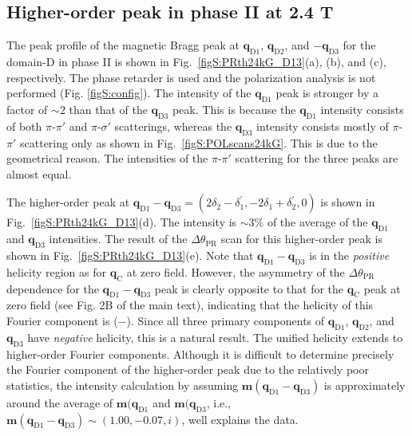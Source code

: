 \documentclass[aps,prb,reprint,superscriptaddress,amsmath,amssymb]{revtex4-2}
\begin{document}
\newpage
\subsection{Higher-order peak in phase II at 2.4 T}
The peak profile of the magnetic Bragg peak at $\bm{q}_{\text{D1}}$, $\bm{q}_{\text{D2}}$, and $-\bm{q}_{\text{D3}}$ for the domain-D in phase II is shown in Fig.~\ref{figS:PRth24kG_D13}(a), (b), and (c), respectively. The phase retarder is used and the polarization analysis is not performed (Fig. \ref{figS:config}). 
The intensity of the $\bm{q}_{\text{D1}}$ peak is stronger by a factor of $\sim 2$ than that of the $\bm{q}_{\text{D3}}$ peak. 
This is because the $\bm{q}_{\text{D1}}$ intensity consists of both $\pi$-$\pi'$ and $\pi$-$\sigma'$ scatterings, whereas the $\bm{q}_{\text{D3}}$ intensity consists mostly of $\pi$-$\pi'$ scattering only as shown in Fig.~\ref{figS:POLscans24kG}. 
This is due to the geometrical reason. The intensities of the $\pi$-$\pi'$ scattering for the three peaks are almost equal. 

The higher-order peak at $\bm{q}_{\text{D1}}-\bm{q}_{\text{D3}}=(2\delta_2-\delta_1^{\prime},-2\delta_1+\delta_2^{\prime}, 0)$ is shown in Fig.~\ref{figS:PRth24kG_D13}(d). The intensity is $\sim 3$\% of the average of the $\bm{q}_{\text{D1}}$ and $\bm{q}_{\text{D3}}$ intensities. 
The result of the $\Delta\theta_{\text{PR}}$ scan for this higher-order peak is shown in Fig.~\ref{figS:PRth24kG_D13}(e). 
Note that $\bm{q}_{\text{D1}}-\bm{q}_{\text{D3}}$ is in the \textit{positive} helicity region as for $\bm{q}_{\text{C}}$ at zero field. 
However, the asymmetry of the $\Delta\theta_{\text{PR}}$ dependence for the $\bm{q}_{\text{D1}}-\bm{q}_{\text{D3}}$ peak is clearly opposite to that for the $\bm{q}_{\text{C}}$ peak at zero field (see Fig. 2B of the main text), indicating that the helicity of this Fourier component is ($-$). 
Since all three primary components of $\bm{q}_{\text{D1}}$, $\bm{q}_{\text{D2}}$, and $\bm{q}_{\text{D3}}$ have \textit{negative} helicity, this is a natural result. The unified helicity extends to higher-order Fourier components. 
Although it is difficult to determine precisely the Fourier component of the higher-order peak due to the relatively poor statistics, the intensity calculation by assuming $\bm{m}(\bm{q}_{\text{D1}}-\bm{q}_{\text{D3}})$ is approximately around the average of $\bm{m}(\bm{q}_{\text{D1}}$ and $\bm{m}(\bm{q}_{\text{D3}}$, i.e., $\bm{m}(\bm{q}_{\text{D1}}-\bm{q}_{\text{D3}}) \sim (1.00, -0.07, i)$, well explains the data. 
\end{document}
